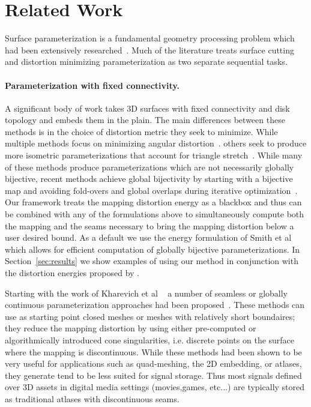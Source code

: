 
\section{Related Work}
\label{sec:related}
Surface parameterization is a fundamental geometry processing problem which had been extensively researched~\cite{Sheffer07_ParameterizationSurvey,Hormann2008}.
Much of the literature treats  surface cutting and distortion minimizing parameterization as two separate sequential tasks. 

\paragraph{Parameterization with fixed connectivity.}
A significant body of work takes 3D surfaces with fixed connectivity and disk topology and embeds them in the plain.  The main differences between these methods is in the choice of distortion metric they seek to minimize.  While multiple methods focus on minimizing angular distortion~\cite{Floater2003,Sheffer2005ABFPP,Levy2002,Aigerman2015,Sawhney:2017}. 
others seek to produce more isometric parameterizations that account for triangle stretch~\cite{Sander2001Texture,Hormann2000MIPS,Rabinovich2017,Zhu2017BCQN,Shtengel:GOvCM:2017,claici2017isometry}. While many of these methods produce parameterizations which are not necessarily globally bijective, recent methods achieve global bijectivity by starting with a bijective map and avoiding fold-overs and global overlaps during iterative optimization~\cite{Smith2015Bijective,Jiang2017Simplicial}.
Our framework treats the mapping distortion energy as a blackbox and thus can be combined with any of the formulations above to simultaneously compute both the mapping and the seams necessary to bring the mapping distortion below a user desired bound. As a default we use the energy formulation of Smith et al~ which allows for efficient computation of globally bijective parameterizations.  
In Section~\ref{sec:results} we show examples of using our method in conjunction with the distortion energies proposed by .
%
 

Starting with the work of Kharevich et al ~\cite{Kharevich} a number of seamless or globally continuous parameterization approaches had been proposed~\cite{pgp,others}. These methods can use as starting point closed meshes or meshes with relatively short boundaires; they reduce the mapping distortion by using either pre-computed or algorithmically introduced cone singularities, i.e. discrete points on the surface where the mapping is discontinuous. While these methods had been shown to be very useful for applications such as quad-meshing, the 2D embedding, or atlases, they generate tend to be less suited for signal storage. Thus most signals defined over 3D assets in digital media settings (movies,games, etc...) are typically stored as traditional atlases with discontinuous seams.  

